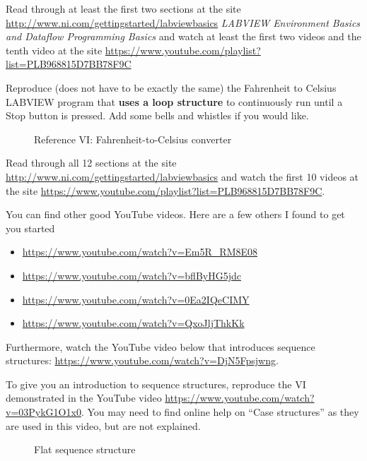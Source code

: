 \documentclass[11pt]{article}
\begin{document}
\MakeAssignmentTitle

\Ex[Temperature]

Read through at least the first two sections at the site \url{http://www.ni.com/gettingstarted/labviewbasics} \textit{LABVIEW Environment Basics and Dataflow Programming Basics} and watch at least the first two videos and the tenth video at the site \url{https://www.youtube.com/playlist?list=PLB968815D7BB78F9C}

Reproduce (does not have to be exactly the same) the Fahrenheit to Celsius LABVIEW program that \textbf{uses a loop structure} to continuously run until a Stop button is pressed. Add some bells and whistles if you would like.
%
\begin{figure}[H]
    \centering
    \caption{Reference VI: Fahrenheit-to-Celsius converter}
\end{figure}
%

Read through all 12 sections at the site \url{http://www.ni.com/gettingstarted/labviewbasics} and watch the first 10 videos at the site \url{https://www.youtube.com/playlist?list=PLB968815D7BB78F9C}.

You can find other good YouTube videos. Here are a few others I found to get you started
\begin{itemize}
    \item \url{https://www.youtube.com/watch?v=Em5R_RM8E08}
    \item \url{https://www.youtube.com/watch?v=bflByHG5jdc}
    \item \url{https://www.youtube.com/watch?v=0Ea2IQeCIMY}
    \item \url{https://www.youtube.com/watch?v=QxoJljThkKk}
\end{itemize}
%
Furthermore, watch the YouTube video below that introduces sequence structures: \url{https://www.youtube.com/watch?v=DjN5Fpsjwng}.

To give you an introduction to sequence structures, reproduce the VI demonstrated in the YouTube video \url{https://www.youtube.com/watch?v=03PykG1O1x0}. You may need to find online help on “Case structures” as they are used in this video, but are not explained.
%
\begin{figure}[H]
    \centering
    \caption{Flat sequence structure}
\end{figure}
%
\end{document}
